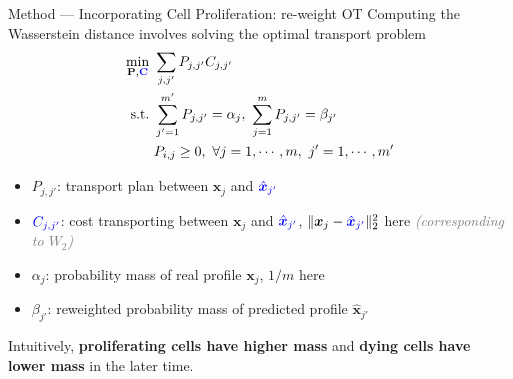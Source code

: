 \documentclass[10pt]{beamer}
\begin{document}

\begin{frame}{Method --- \normalsize Incorporating Cell Proliferation: re-weight OT}
    \small
    Computing the Wasserstein distance involves solving the optimal transport problem
    \begin{align}
        \min_{\mathbf{P},\textcolor{blue}{\mathbf{C}}}~& \sum_{j,j'}P_{j,j'}C_{j,j'} \\
        \text{s.t.}~ & \sum_{j'=1}^{m'}P_{j,j'} = \alpha_j,~ \sum_{j=1}^{m}P_{j,j'} = \beta_{j'} \\
        & P_{i,j} \geq 0,~\forall j=1,\cdots,m,~j'=1,\cdots,m' 
    \end{align}
    \begin{itemize}
        \item $P_{j,j'}$: transport plan between $\bm{x}_j$ and $\textcolor{blue}{\hat{\bm{x}}_{j'}}$
        \item $\textcolor{blue}{C_{j,j'}}$: cost transporting between $\bm{x}_j$ and $\textcolor{blue}{\hat{\bm{x}}_{j'}}$, $\|\bm{x}_j-\textcolor{blue}{\hat{\bm{x}}_{j'}}\|_2^2$ here \textcolor{gray}{\textit{(corresponding to $W_2$)}}
        \item $\alpha_j$: probability mass of real profile $\bm{x}_j$, $1/m$ here
        \item $\beta_{j'}$: reweighted probability mass of predicted profile $\hat{\bm{x}}_{j'}$
    \end{itemize}
    
    \medskip
    
    Intuitively, \textbf{proliferating cells have higher mass} and \textbf{dying cells have lower mass} in the later time.
\end{frame}
\end{document}
